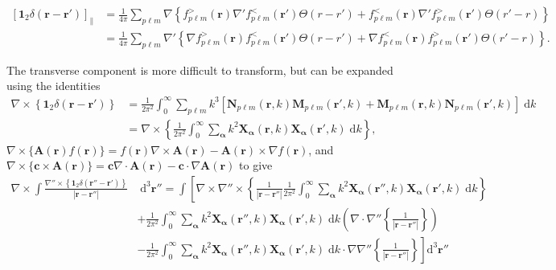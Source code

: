 \documentclass{article}
\begin{document}
\begin{equation}
\begin{split}
\left[\bm{1}_2\delta(\mathbf{r} - \mathbf{r}')\right]_\parallel &= \frac{1}{4\pi}\sum_{p\ell m}\nabla\left\{f_{p\ell m}^>(\mathbf{r})\nabla'f_{p\ell m}^<(\mathbf{r}')\Theta(r - r') + f_{p\ell m}^<(\mathbf{r})\nabla'f_{p\ell m}^>(\mathbf{r}')\Theta(r' - r)\right\}\\
&= \frac{1}{4\pi}\sum_{p\ell m}\nabla'\left\{\nabla f_{p\ell m}^>(\mathbf{r})f_{p\ell m}^<(\mathbf{r}')\Theta(r - r') + \nabla f_{p\ell m}^<(\mathbf{r})f_{p\ell m}^>(\mathbf{r}')\Theta(r' - r)\right\}.
\end{split}
\end{equation}

The transverse component is more difficult to transform, but can be expanded using the identities
\begin{equation}
\begin{split}
\nabla\times\left\{\bm{1}_2\delta(\mathbf{r} - \mathbf{r}')\right\} &= \frac{1}{2\pi^2}\int_0^\infty\sum_{p\ell m}k^3\left[\mathbf{N}_{p\ell m}(\mathbf{r},k)\mathbf{M}_{p\ell m}(\mathbf{r}',k) + \mathbf{M}_{p\ell m}(\mathbf{r},k)\mathbf{N}_{p\ell m}(\mathbf{r}',k)\right]\;\mathrm{d}k\\
&= \nabla\times\left\{\frac{1}{2\pi^2}\int_0^\infty\sum_{\bm{\alpha}}k^2\mathbf{X}_{\bm{\alpha}}(\mathbf{r},k)\mathbf{X}_{\bm{\alpha}}(\mathbf{r}',k)\;\mathrm{d}k\right\},
\end{split}
\end{equation}
$\nabla\times\{\mathbf{A}(\mathbf{r})f(\mathbf{r})\} = f(\mathbf{r})\nabla\times\mathbf{A}(\mathbf{r}) - \mathbf{A}(\mathbf{r})\times\nabla f(\mathbf{r})$, and $\nabla\times\{\mathbf{c}\times \mathbf{A}(\mathbf{r})\} = \mathbf{c}\nabla\cdot \mathbf{A}(\mathbf{r}) - \mathbf{c}\cdot\nabla \mathbf{A}(\mathbf{r})$ to give
\begin{equation}
\begin{split}
\nabla\times\int\frac{\nabla''\times\left\{\bm{1}_2\delta(\mathbf{r}'' - \mathbf{r}')\right\}}{|\mathbf{r} - \mathbf{r}''|}&\;\mathrm{d}^3\mathbf{r}'' = \int\left[\nabla\times\nabla''\times\left\{\frac{1}{|\mathbf{r} - \mathbf{r}''|}\frac{1}{2\pi^2}\int_0^\infty\sum_{\bm{\alpha}}k^2\mathbf{X}_{\bm{\alpha}}(\mathbf{r}'',k)\mathbf{X}_{\bm{\alpha}}(\mathbf{r}',k)\;\mathrm{d}k\right\}\right.\\
&+\frac{1}{2\pi^2}\int_0^\infty\sum_{\bm{\alpha}}k^2\mathbf{X}_{\bm{\alpha}}(\mathbf{r}'',k)\mathbf{X}_{\bm{\alpha}}(\mathbf{r}',k)\;\mathrm{d}k\left(\nabla\cdot\nabla''\left\{\frac{1}{|\mathbf{r} - \mathbf{r}''|}\right\}\right)\\
&\left.-\frac{1}{2\pi^2}\int_0^\infty\sum_{\bm{\alpha}}k^2\mathbf{X}_{\bm{\alpha}}(\mathbf{r}'',k)\mathbf{X}_{\bm{\alpha}}(\mathbf{r}',k)\;\mathrm{d}k\cdot\nabla\nabla''\left\{\frac{1}{|\mathbf{r} - \mathbf{r}''|}\right\}\right]\mathrm{d}^3\mathbf{r}''
\end{split}
\end{equation}
\end{document}
